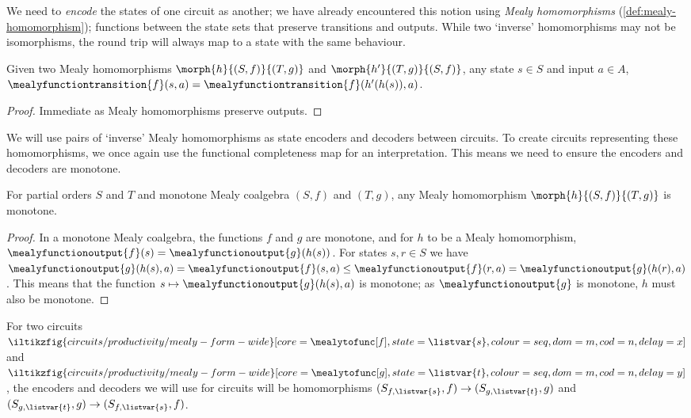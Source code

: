 We need to \emph{encode} the states of one circuit as another; we have already
encountered this notion using \emph{Mealy homomorphisms}
(\cref{def:mealy-homomorphism});
functions between the state sets that preserve transitions and outputs.
While two `inverse' homomorphisms may not be isomorphisms, the round
trip will always map to a state with the same behaviour.

\begin{lemma}
    Given two Mealy homomorphisms \(\morph{h}{(S,f)}{(T,g)}\) and
    \(\morph{h^\prime}{(T,g)}{(S,f)}\), any state \(s \in S\) and input
    \(a \in A\), \(
    \mealyfunctiontransition{f}(s, a)
    =
    \mealyfunctiontransition{f}(h^\prime(h(s)), a)
    \).
\end{lemma}
\begin{proof}
    Immediate as Mealy homomorphisms preserve outputs.
\end{proof}

We will use pairs of `inverse' Mealy homomorphisms as state encoders and
decoders between circuits.
To create circuits representing these homomorphisms, we once again use the
functional completeness map for an interpretation.
This means we need to ensure the encoders and decoders are monotone.

\begin{lemma}
    For partial orders \(S\) and \(T\) and monotone Mealy coalgebra
    \((S,f)\) and \((T,g)\), any Mealy homomorphism \(\morph{h}{(S,f)}{(T,g)}\)
    is monotone.
\end{lemma}
\begin{proof}
    In a monotone Mealy coalgebra, the functions \(f\) and \(g\) are monotone,
    and for \(h\) to be a Mealy homomorphism, \(
    \mealyfunctionoutput{f}(s)
    =
    \mealyfunctionoutput{g}(h(s))
    \).
    For states \(s,r \in S\) we have \(
    \mealyfunctionoutput{g}(h(s), a)
    =
    \mealyfunctionoutput{f}(s, a)
    \leq
    \mealyfunctionoutput{f}(r, a)
    =
    \mealyfunctionoutput{g}(h(r), a)
    \).
    This means that the function \(
    s \mapsto \mealyfunctionoutput{g}(h(s), a)
    \) is monotone; as \(\mealyfunctionoutput{g}\) is monotone, \(h\) must
    also be monotone.
\end{proof}

For two circuits \(
\iltikzfig{circuits/productivity/mealy-form-wide}[core=\mealytofunc[f],state=\listvar{s},colour=seq,dom=m,cod=n,delay=x]
\) and \(
\iltikzfig{circuits/productivity/mealy-form-wide}[core=\mealytofunc[g],state=\listvar{t},colour=seq,dom=m,cod=n,delay=y]
\), the encoders and decoders we will use for circuits will be homomorphisms
\((S_{f,\listvar{s}},f) \to (S_{g,\listvar{t}},g)\)
and
\((S_{g,\listvar{t}},g) \to (S_{f,\listvar{s}},f)\).


